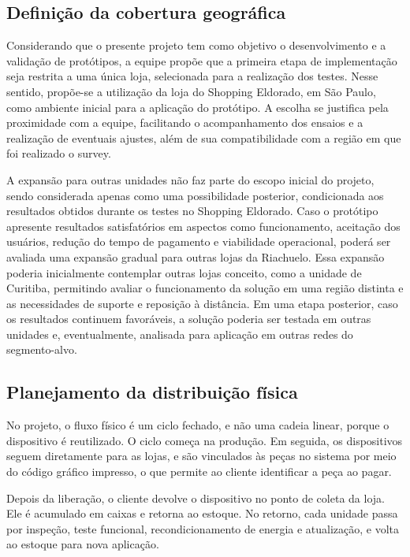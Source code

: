 \subsection{Definição da cobertura geográfica}
\label{subsec:comerc_cobertura}



Considerando que o presente projeto tem como objetivo o desenvolvimento e a validação de protótipos, a equipe propõe que a primeira etapa de implementação seja restrita a uma única loja, selecionada para a realização dos testes. Nesse sentido, propõe-se a utilização da loja do Shopping Eldorado, em São Paulo, como ambiente inicial para a aplicação do protótipo. A escolha se justifica pela proximidade com a equipe, facilitando o acompanhamento dos ensaios e a realização de eventuais ajustes, além de sua compatibilidade com a região em que foi realizado o survey.

A expansão para outras unidades não faz parte do escopo inicial do projeto, sendo considerada apenas como uma possibilidade posterior, condicionada aos resultados obtidos durante os testes no Shopping Eldorado. Caso o protótipo apresente resultados satisfatórios em aspectos como funcionamento, aceitação dos usuários, redução do tempo de pagamento e viabilidade operacional, poderá ser avaliada uma expansão gradual para outras lojas da Riachuelo. Essa expansão poderia inicialmente contemplar outras lojas conceito, como a unidade de Curitiba, permitindo avaliar o funcionamento da solução em uma região distinta e as necessidades de suporte e reposição à distância. Em uma etapa posterior, caso os resultados continuem favoráveis, a solução poderia ser testada em outras unidades e, eventualmente, analisada para aplicação em outras redes do segmento-alvo.

\subsection{Planejamento da distribuição física}
\label{subsec:comerc_distribuicao}



No projeto, o fluxo físico é um ciclo fechado, e não uma cadeia linear, porque o dispositivo é reutilizado. O ciclo começa na produção. Em seguida, os dispositivos seguem diretamente para as lojas, e são vinculados às peças no sistema por meio do código gráfico impresso, o que permite ao cliente identificar a peça ao pagar. 

Depois da liberação, o cliente devolve o dispositivo no ponto de coleta da loja. Ele é acumulado em caixas e retorna ao estoque. No retorno, cada unidade passa por inspeção, teste funcional, recondicionamento de energia e atualização, e volta ao estoque para nova aplicação.

